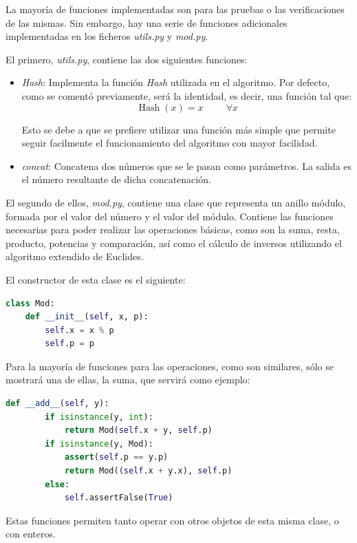La mayoría de funciones implementadas son para las pruebas o las verificaciones de las mismas. Sin embargo, hay una serie de funciones adicionales implementadas en los ficheros \emph{utils.py} y \emph{mod.py}.

El primero, \emph{utils.py}, contiene las dos siguientes funciones:
\begin{itemize}
    \item \textit{Hash}: Implementa la función \emph{Hash} utilizada en el algoritmo. Por defecto, como se comentó previamente, será la identidad, es decir, una función tal que:
    $$\operatorname{Hash}(x) = x \hspace{1cm} \forall x$$

    Esto se debe a que se prefiere utilizar una función más simple que permite seguir facilmente el funcionamiento del algoritmo con mayor facilidad.

    \item \textit{concat}: Concatena dos números que se le pasan como parámetros. La salida es el número resultante de dicha concatenación.
\end{itemize}

El segundo de ellos, \emph{mod.py}, contiene una clase que representa un anillo módulo, formada por el valor del número y el valor del módulo. Contiene las funciones necesarias para poder realizar las operaciones básicas, como son la suma, resta, producto, potencias y comparación, así como el cálculo de inversos utilizando el algoritmo extendido de Euclides.

El constructor de esta clase es el siguiente:
\begin{lstlisting}[language=Python, basicstyle=\footnotesize]
class Mod:
    def __init__(self, x, p):
        self.x = x % p
        self.p = p
\end{lstlisting}

Para la mayoría de funciones para las operaciones, como son similares, sólo se mostrará una de ellas, la suma, que servirá como ejemplo:
\begin{lstlisting}[language=Python, basicstyle=\footnotesize]
    def __add__(self, y):
        if isinstance(y, int):
            return Mod(self.x + y, self.p)
        if isinstance(y, Mod):
            assert(self.p == y.p)
            return Mod((self.x + y.x), self.p)
        else:
            self.assertFalse(True)
\end{lstlisting}
Estas funciones permiten tanto operar con otros objetos de esta misma clase, o con enteros.

